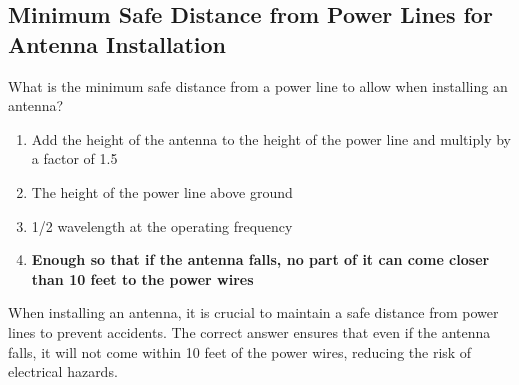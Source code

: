 \subsection{Minimum Safe Distance from Power Lines for Antenna Installation}
\label{T0B06}

\begin{tcolorbox}[colback=gray!10!white,colframe=black!75!black,title=T0B06]
What is the minimum safe distance from a power line to allow when installing an antenna?
\begin{enumerate}[noitemsep]
    \item Add the height of the antenna to the height of the power line and multiply by a factor of 1.5
    \item The height of the power line above ground
    \item 1/2 wavelength at the operating frequency
    \item \textbf{Enough so that if the antenna falls, no part of it can come closer than 10 feet to the power wires}
\end{enumerate}
\end{tcolorbox}

When installing an antenna, it is crucial to maintain a safe distance from power lines to prevent accidents. The correct answer ensures that even if the antenna falls, it will not come within 10 feet of the power wires, reducing the risk of electrical hazards.
